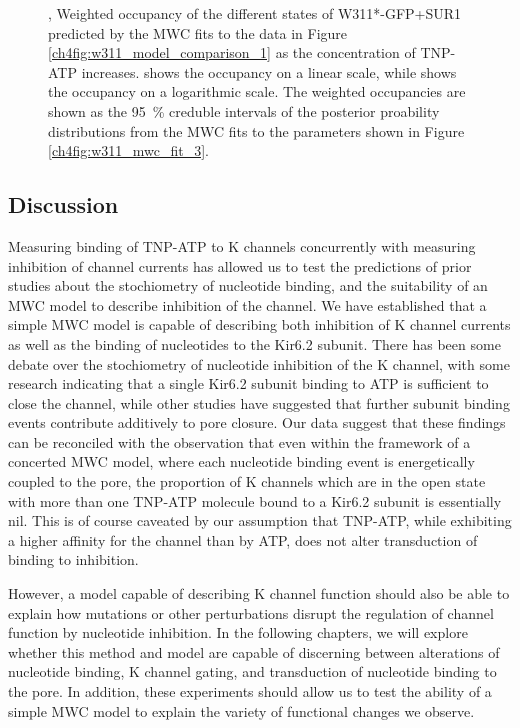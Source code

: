 \begin{figure}[h]
\begin{subfigure}[t]{0.45\textwidth}
	\end{subfigure}
	\caption[Comparing the states and weights of concerted and independent models]{
	,  Weighted occupancy of the different states of W311*-GFP+SUR1 predicted by the MWC fits to the data in Figure \ref{ch4fig:w311_model_comparison_1} as the concentration of TNP-ATP increases.
	 shows the occupancy on a linear scale, while  shows the occupancy on a logarithmic scale.
	The weighted occupancies are shown as the \SI{95}{\percent} creduble intervals of the posterior proability distributions from the MWC fits to the parameters shown in Figure \ref{ch4fig:w311_mwc_fit_3}.
	}\label{ch4fig:w311_model_comparison_2}
\end{figure}

\subsection{Discussion}

Measuring binding of TNP-ATP to K\ATP{} channels concurrently with measuring inhibition of channel currents has allowed us to test the predictions of prior studies about the stochiometry of nucleotide binding, and the suitability of an MWC model to describe inhibition of the channel.
We have established that a simple MWC model is capable of describing both inhibition of K\ATP{} channel currents as well as the binding of nucleotides to the Kir6.2 subunit.
There has been some debate over the stochiometry of nucleotide inhibition of the K\ATP{} channel, with some research indicating that a single Kir6.2 subunit binding to ATP is sufficient to close the channel, while other studies have suggested that further subunit binding events contribute additively to pore closure.
Our data suggest that these findings can be reconciled with the observation that even within the framework of a concerted MWC model, where each nucleotide binding event is energetically coupled to the pore, the proportion of K\ATP{} channels which are in the open state with more than one TNP-ATP molecule bound to a Kir6.2 subunit is essentially nil.
This is of course caveated by our assumption that TNP-ATP, while exhibiting a higher affinity for the channel than by ATP, does not alter transduction of binding to inhibition.

However, a model capable of describing K\ATP{} channel function should also be able to explain how mutations or other perturbations disrupt the regulation of channel function by nucleotide inhibition.
In the following chapters, we will explore whether this method and model are capable of discerning between alterations of nucleotide binding, K\ATP{} channel gating, and transduction of nucleotide binding to the pore.
In addition, these experiments should allow us to test the ability of a simple MWC model to explain the variety of functional changes we observe.
